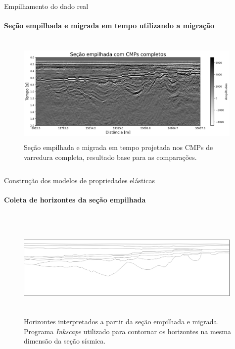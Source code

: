 \documentclass[xcolor=dvipsnames,t]{beamer}
\begin{document}
\begin{frame}{Empilhamento do dado real}
\framesubtitle{Seção empilhada e migrada em tempo utilizando a migração }	

\pause	
\begin{columns}[onlytextwidth, T]
	\begin{column}{.9\textwidth}
		\begin{figure}[h]
			\includegraphics[width=11cm,height=5cm]{../imagens/section.png}	
			\tiny{\caption{Seção empilhada e migrada em tempo projetada nos CMPs de varredura completa, resultado base para as comparações.}} 	
		\end{figure}			
	\end{column}
\end{columns}	
		
\end{frame}
\begin{frame}{Construção dos modelos de propriedades elásticas}
	\framesubtitle{Coleta de horizontes da seção empilhada}	
	
	\pause	
	\begin{columns}[onlytextwidth, T]
		\begin{column}{.9\textwidth}
			\begin{figure}[h]
				\includegraphics[width=11cm,height=5cm]{../imagens/horizontes.png}	
				\tiny{\caption{Horizontes interpretados a partir da seção empilhada e migrada. Programa \textit{Inkscape} utilizado para contornar os horizontes na mesma dimensão da seção sísmica.}} 	
			\end{figure}			
		\end{column}
	\end{columns}	
	
\end{frame}
\end{document}
